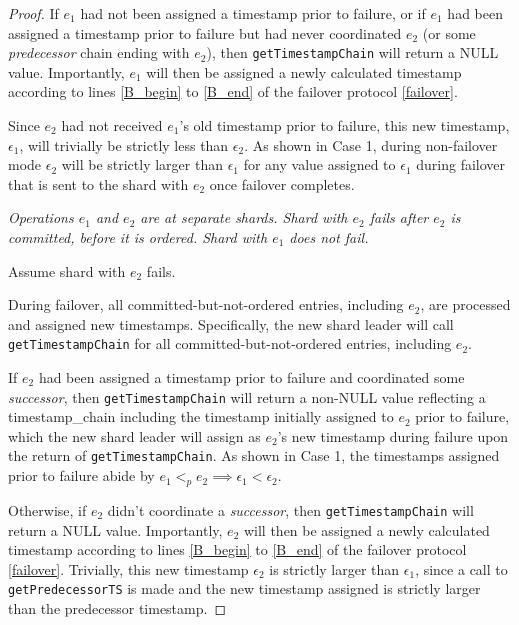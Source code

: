 \begin{proof}
If $e_1$ had not been assigned a timestamp prior to failure, or if $e_1$ had been assigned a timestamp prior to failure but had never coordinated $e_2$ (or some \textit{predecessor} chain ending with $e_2$), then \texttt{getTimestampChain} will return a NULL value. Importantly, $e_1$ will then be assigned a newly calculated timestamp according to lines \ref{B_begin} to \ref{B_end} of the failover protocol \ref{failover}.

Since $e_2$ had not received $e_1$'s old timestamp prior to failure, this new timestamp, $\epsilon_1$, will trivially be strictly less than $\epsilon_2$. As shown in Case 1, during non-failover mode $\epsilon_2$ will be strictly larger than $\epsilon_1$ for any value assigned to $\epsilon_1$ during failover that is sent to the shard with $e_2$ once failover completes.

 \textit{Operations $e_1$ and $e_2$ are at separate shards. Shard with $e_2$ fails after $e_2$ is \textit{committed}, before it is \textit{ordered}. Shard with $e_1$ does not fail.}

Assume shard with $e_2$ fails.

During failover, all committed-but-not-ordered entries, including $e_2$, are processed and assigned new timestamps. Specifically, the new shard leader will call \texttt{getTimestampChain} for all committed-but-not-ordered entries, including $e_2$.

If $e_2$ had been assigned a timestamp prior to failure and coordinated some \textit{successor}, then \texttt{getTimestampChain} will return a non-NULL value reflecting a timestamp\_chain including the timestamp initially assigned to $e_2$ prior to failure, which the new shard leader will assign as $e_2$'s new timestamp during failure upon the return of \texttt{getTimestampChain}. As shown in Case 1, the timestamps assigned prior to failure abide by $e_1 <_p e_2 \implies \epsilon_1 < \epsilon_2$.

Otherwise, if $e_2$ didn't coordinate a \textit{successor}, then \texttt{getTimestampChain} will return a NULL value. Importantly, $e_2$ will then be assigned a newly calculated timestamp according to lines \ref{B_begin} to \ref{B_end} of the failover protocol \ref{failover}. Trivially, this new timestamp $\epsilon_2$ is strictly larger than $\epsilon_1$, since a call to \texttt{getPredecessorTS} is made and the new timestamp assigned is strictly larger than the predecessor timestamp.


\end{proof}
